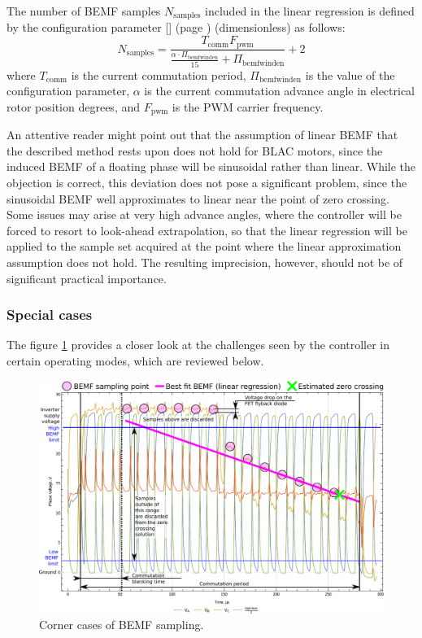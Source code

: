 \documentclass{zubaxdoc}
\newcommand{\CfgRef}[1]{
    \StrSubstitute{#1}{+}{\textunderscore}[\temp]
    \texttt{\temp} {\footnotesize (page \pageref{#1})}
}
\begin{document}
The number of BEMF samples $N_\text{samples}$ included in the linear regression is defined by
the configuration parameter \CfgRef{mot+bemf+win+den} (dimensionless) as follows:
\begin{equation}
N_\text{samples} =
\frac{T_{\text{comm}} F_{\text{pwm}}}{\frac{\alpha\cdot{}\Pi_\text{bemfwinden}}{15} + \Pi_\text{bemfwinden}} + 2
\end{equation}
where $T_{\text{comm}}$ is the current commutation period,
$\Pi_\text{bemfwinden}$ is the value of the configuration parameter,
$\alpha$ is the current commutation advance angle in electrical rotor position degrees,
and $F_{\text{pwm}}$ is the PWM carrier frequency.

An attentive reader might point out that the assumption of linear BEMF that the described method rests
upon does not hold for BLAC motors, since the induced BEMF of a floating phase will be sinusoidal rather
than linear.
While the objection is correct, this deviation does not pose a significant problem, since the sinusoidal
BEMF well approximates to linear near the point of zero crossing.
Some issues may arise at very high advance angles, where the controller will be forced to resort to
look-ahead extrapolation, so that the linear regression will be applied to the sample set acquired
at the point where the linear approximation assumption does not hold.
The resulting imprecision, however, should not be of significant practical importance.

\subsubsection{Special cases}

The figure \ref{phase_voltage_sampling_corner_cases} provides a closer look at the challenges
seen by the controller in certain operating modes, which are reviewed below.

\begin{figure}[hbtp]
    \centering
	\includegraphics[width=\textwidth]{phase_voltages_braking_high_advance_angle}
	\caption{Corner cases of BEMF sampling.
	\label{phase_voltage_sampling_corner_cases}}
\end{figure}
\end{document}
